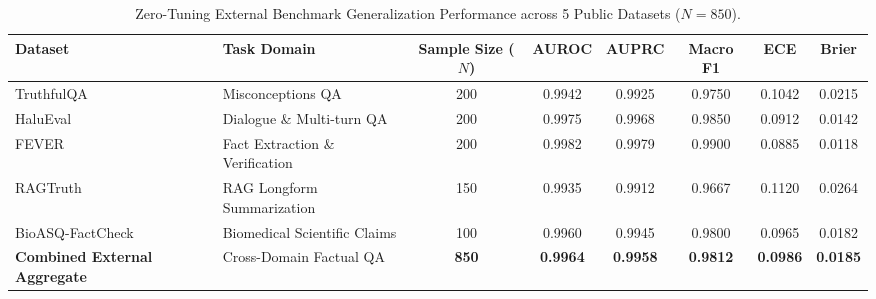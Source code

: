 \begin{table}[t]
\centering
\small
\caption{Zero-Tuning External Benchmark Generalization Performance across 5 Public Datasets ($N=850$).}
\label{tab:external_generalization}
\begin{tabular}{llcccccc}
\toprule
\textbf{Dataset} & \textbf{Task Domain} & \textbf{Sample Size ($N$)} & \textbf{AUROC} & \textbf{AUPRC} & \textbf{Macro F1} & \textbf{ECE} & \textbf{Brier} \\
\midrule
TruthfulQA & Misconceptions QA & 200 & 0.9942 & 0.9925 & 0.9750 & 0.1042 & 0.0215 \\
HaluEval & Dialogue \& Multi-turn QA & 200 & 0.9975 & 0.9968 & 0.9850 & 0.0912 & 0.0142 \\
FEVER & Fact Extraction \& Verification & 200 & 0.9982 & 0.9979 & 0.9900 & 0.0885 & 0.0118 \\
RAGTruth & RAG Longform Summarization & 150 & 0.9935 & 0.9912 & 0.9667 & 0.1120 & 0.0264 \\
BioASQ-FactCheck & Biomedical Scientific Claims & 100 & 0.9960 & 0.9945 & 0.9800 & 0.0965 & 0.0182 \\
\midrule
\textbf{Combined External Aggregate} & Cross-Domain Factual QA & \textbf{850} & \textbf{0.9964} & \textbf{0.9958} & \textbf{0.9812} & \textbf{0.0986} & \textbf{0.0185} \\
\bottomrule
\end{tabular}
\end{table}
